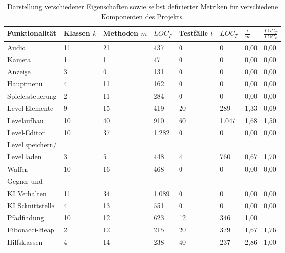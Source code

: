 \begin{table}[b!]
\caption[abc]{Darstellung verschiedener Eigenschaften sowie selbst definierter Metriken für verschiedene Komponenten des Projekts.}
\begin{center}
\begin{tabular}{|l||l|l|l|l|l||l|l|}
\hline
  Funktionalität & Klassen $k$ & Methoden $m$ & $LOC_F$ & Testfälle $t$ & $LOC_T$ & $\frac{t}{m}$ & $\frac{LOC_T}{LOC_F}$ \\
  \hline
  Audio & 11 & 21 & 437 & 0 & 0 & 0,00 & 0,00 \\
  Kamera & 1 & 1 & 47 & 0 & 0 & 0,00 & 0,00 \\
  Anzeige & 3 & 0 & 131 & 0 & 0 & 0,00 & 0,00 \\
  Hauptmenü & 4 & 11 & 162 & 0 & 0 & 0,00 & 0,00\\
  Spielersteuerung & 2 & 11 & 284 & 0 & 0 & 0,00 & 0,00\\
  Level Elemente & 9 & 15 & 419 & 20 & 289 & 1,33 & 0,69 \\
  Levelaufbau & 10 & 40 & 910 & 60 & 1.047 & 1,68 & 1,50\\
  Level-Editor & 10 & 37 & 1.282 & 0 & 0 & 0,00 & 0,00\\
  Level speichern/ &&&&&&&\\
  Level laden & 3 & 6 & 448 & 4 & 760 & 0,67 & 1,70\\
  Waffen & 10 & 16 & 468 & 0 & 0 & 0,00 & 0,00\\
  Gegner und &&&&&&&\\
  KI Verhalten & 11 & 34 & 1.089 & 0 & 0 & 0,00 & 0,00\\
  KI Schnittstelle & 4 & 13 & 551 & 0 & 0 & 0,00 & 0,00\\
  Pfadfindung & 10 & 12 & 623 & 12 & 346 & 1,00 & \\
  Fibonacci-Heap & 2 & 12 & 215 & 20 & 379 & 1,67 & 1,76\\  
  Hilfsklassen & 4 & 14 & 238 & 40 & 237 & 2,86 & 1,00\\  
  \hline
\end{tabular}
\label{tab:testabdeckung}
\end{center}
\end{table}

